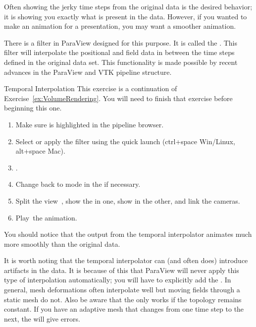 Often showing the jerky time steps from the original data is the desired
behavior; it is showing you exactly what is present in the data.  However,
if you wanted to make an animation for a presentation, you may want a
smoother animation.

There is a filter in ParaView designed for this purpose.  It is called
the .  This filter will interpolate the
positional and field data in between the time steps defined in the original
data set.  This functionality is made possible by recent advances in the
ParaView and VTK pipeline structure.

\begin{exercise}{Temporal Interpolation}
  \label{ex:TemporalInterpolation}%
  This exercise is a continuation of Exercise~\ref{ex:VolumeRendering}.
  You will need to finish that exercise before beginning this one.

  \begin{enumerate}
  \item Make sure  is highlighted in the pipeline browser.
  \item {} Select  \ra
     \ra {} or apply the
     filter using the quick launch (ctrl+space
    Win/Linux, alt+space Mac).
  \item \apply.
  \item Change back to  mode in the  if
    necessary.
  \item Split the view~\splitViewH, show the  in
    one, show  in the other, and link the cameras.
  \item Play~\vcrPlay the animation.
  \end{enumerate}

  You should notice that the output from the temporal interpolator animates
  much more smoothly than the original data.
\end{exercise}

It is worth noting that the temporal interpolator can (and often does)
introduce artifacts in the data.  It is because of this that ParaView will
never apply this type of interpolation automatically; you will have to
explicitly add the .  In general, mesh
deformations often interpolate well but moving fields through a static mesh
do not.  Also be aware that the  only works if
the topology remains constant.  If you have an adaptive mesh that changes
from one time step to the next, the  will give
errors.


